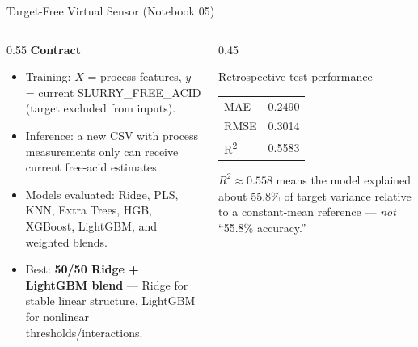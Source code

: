 \documentclass[11pt,aspectratio=169]{beamer}
\begin{document}
\begin{frame}{Target-Free Virtual Sensor (Notebook 05)}
\begin{columns}[T]
\begin{column}{0.55\textwidth}
\textbf{Contract}
\begin{itemize}
    \small
    \item Training: $X$ = process features, $y$ = current SLURRY\_FREE\_ACID (target excluded from inputs).
    \item Inference: a new CSV with process measurements only can receive current free-acid estimates.
    \item Models evaluated: Ridge, PLS, KNN, Extra Trees, HGB, XGBoost, LightGBM, and weighted blends.
    \item Best: \textbf{50/50 Ridge + LightGBM blend} — Ridge for stable linear structure, LightGBM for nonlinear thresholds/interactions.
\end{itemize}
\end{column}
\begin{column}{0.45\textwidth}
\begin{block}{Retrospective test performance}
\small
\begin{tabular}{ll}
MAE & 0.2490 \\
RMSE & 0.3014 \\
R\textsuperscript{2} & 0.5583 \\
\end{tabular}
\vspace{0.15cm}
\small $R^2 \approx 0.558$ means the model explained about 55.8\% of target variance relative to a constant-mean reference — \emph{not} ``55.8\% accuracy.''
\end{block}
\end{column}
\end{columns}
\end{frame}
\end{document}
